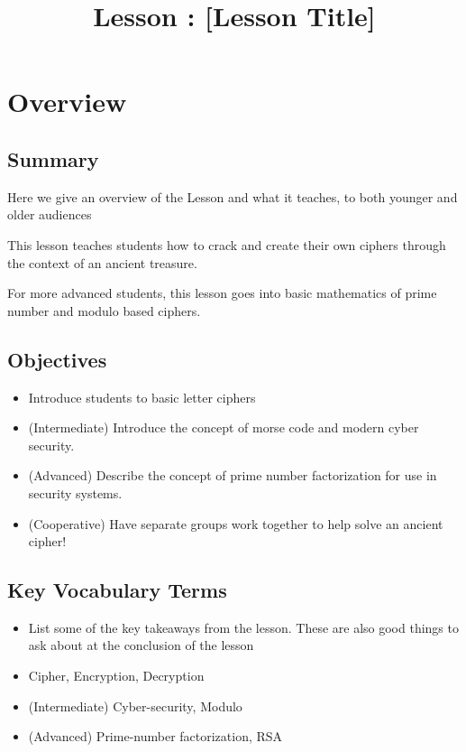 \documentclass{lessonplan}
\title{Lesson \lessonNumber: [Lesson Title]}
\author{\linkHome}
\date{}
\begin{document}
  \maketitle

  \section{Overview}
    \subsection{Summary}
      Here we give an overview of the Lesson and what it teaches, to
      both younger and older audiences

      This lesson teaches students how to crack and create their own
      ciphers through the context of an ancient treasure.

      For more advanced students, this lesson goes into basic mathematics 
      of prime number and modulo based ciphers. 

    \subsection{Objectives}
    \begin{itemize}
      \item Introduce students to basic letter ciphers
      \item (Intermediate) Introduce the concept of morse code and modern cyber security.
      \item (Advanced) Describe the concept of prime number factorization for use in security systems.
      \item (Cooperative) Have separate groups work together to help solve an ancient cipher!
    \end{itemize}
    \subsection{Key Vocabulary Terms}
    \begin{itemize}
      \item List some of the key takeaways from the lesson.  These are
        also good things to ask about at the conclusion of the lesson
      \item Cipher, Encryption, Decryption
      \item (Intermediate) Cyber-security, Modulo
      \item (Advanced) Prime-number factorization, RSA
    \end{itemize}
\end{document}
